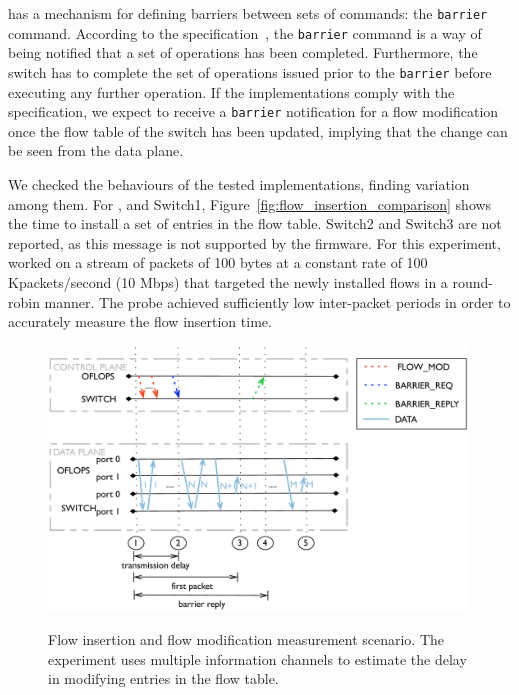 \of has a mechanism for defining barriers between sets of commands: the
\texttt{barrier} command. According to the \of
specification~, the \texttt{barrier} command is a way of being
notified that a set of \of operations has been completed. Furthermore, the switch
has to complete the set of operations issued prior to the \texttt{barrier}
before executing any further operation. If the \of implementations comply with
the specification, we expect to receive a \texttt{barrier} notification for a
flow modification once the flow table of the switch has been updated, implying
that the change can be seen from the data plane.

We checked the behaviours of the tested \of implementations, finding variation among
them. For \ovs, and Switch1, Figure~\ref{fig:flow_insertion_comparison} shows the
time to install a set of entries in the flow table. Switch2 and Switch3 are not
reported, as this \of message is not supported by the firmware.  For this
experiment, \oflops worked on a stream of packets of 100 bytes at a constant
rate of 100 Kpackets/second (10 Mbps) that targeted the newly installed flows in a
round-robin manner. The probe achieved sufficiently low inter-packet periods in
order to accurately measure the flow insertion time.

\begin{figure}[h]
  \centering
    \includegraphics[width=0.99\textwidth]{Chapter1/Chapter1Figs/flow_insertion_seq_diagram} 
    \label{fig:flow_mod_scenario}
    \caption[Flow insertion and flow modification measurement scenario] {Flow 
    insertion and flow modification measurement scenario. The experiment uses
    multiple information channels to estimate the delay in modifying entries in
    the flow table.}
\end{figure}

